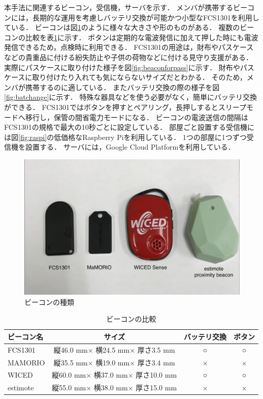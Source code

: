 本手法に関連するビーコン，受信機，サーバを示す．
メンバが携帯するビーコンには，長期的な運用を考慮しバッテリ交換が可能かつ小型なFCS1301\cite{fcs1301}を利用している．
ビーコンは図\ref{fig:beacons}のように様々な大きさや形のものがある．
複数のビーコンの比較を表\ref{tb:beacons}に示す．
ボタンは定期的な電波発信に加えて押した時にも電波発信できるため，点検時に利用できる．
FCS1301の用途は，財布やパスケースなどの貴重品に付ける紛失防止や子供の荷物などに付ける見守り支援がある．
実際にパスケースに取り付けた様子を図\ref{fig:beaconforpass}に示す．
財布やパスケースに取り付けたり入れても気にならないサイズだとわかる．
そのため，メンバが携帯するのに適している．
またバッテリ交換の際の様子を図\ref{fig:batchange}に示す．
特殊な器具などを使う必要がなく，簡単にバッテリ交換ができる．
FCS1301ではボタンを押すとペアリング，長押しするとスリープモードへ移行し，保管の間省電力モードになる．
ビーコンの電波送信の間隔はFCS1301の規格で最大の10秒ごとに設定している．
部屋ごと設置する受信機には図\ref{fig:raspi}の低価格なRaspberry Pi\cite{raspi}を利用している．
1つの部屋に1つずつ受信機を設置する．
サーバには，Google Cloud Platform\cite{gcp}を利用している．

\begin{figure}[H]
  \begin{center}
    \includegraphics[width=150mm]{image/beaconType.jpg}
    \caption{ビーコンの種類}
    \label{fig:beacons}
  \end{center}
\end{figure}

\begin{table}[H]
  \begin{center}
    \caption{ビーコンの比較}
    \label{tb:beacons}
    \begin{tabular}{|l|c|c|c|} \hline
      ビーコン名    & サイズ                           & バッテリ交換 & ボタン \\ \hline \hline
      FCS1301  & 縦46.0 mm× 横24.5 mm× 厚さ3.5 mm  & ○      & ○   \\
      MAMORIO  & 縦35.5 mm× 横19.0 mm× 厚さ3.4 mm  & ×      & ×   \\
      WICED    & 縦60.0 mm× 横37.0 mm× 厚さ10.0 mm & ○      & ○   \\
      estimote & 縦55.0 mm× 横38.0 mm× 厚さ15.0 mm & ×      & ×   \\\hline
    \end{tabular}
  \end{center}
\end{table}

